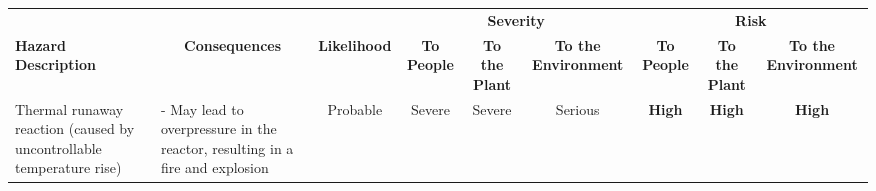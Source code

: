 \begin{landscape}
\begin{table}
\begin{tabularx}{\linewidth}{|X|X|c|c|c|c|c|c|c|}
                                                                                                                         & \multicolumn{1}{c|}{}                                                                                                                                                                                                                                                                                                                                                                          &                                       & \multicolumn{3}{c|}{\textbf{Severity}}                                                                                                                                                                  & \multicolumn{3}{c|}{\textbf{Risk}}                                                                                                                                                                       \\ \cline{4-9} 
\multirow{-2}{*}{\textbf{Hazard Description}}                                                                                     & \multicolumn{1}{c|}{\multirow{-2}{*}{\textbf{Consequences}}}                                                                                                                                                                                                                                                                                                                                   & \multirow{-2}{*}{\textbf{Likelihood}} & \textbf{To  People} & \textbf{To the Plant} & \textbf{To the Environment} & \textbf{To  People} & \textbf{To the Plant} & \textbf{To the  Environment}\\
Thermal runaway  reaction  (caused by  uncontrollable  temperature rise) & - May lead to overpressure in the reactor,    resulting in a fire and explosion                                                                                                                                                                                                                                                                      & Probable                              & Severe                                                        & Severe                                                          & Serious                                                               & \cellcolor[HTML]{FD6864}\textbf{High}                         & \cellcolor[HTML]{FD6864}\textbf{High}                           & \cellcolor[HTML]{FD6864}\textbf{High}                                   \\

\end{tabularx}
\end{table}
\end{landscape}

